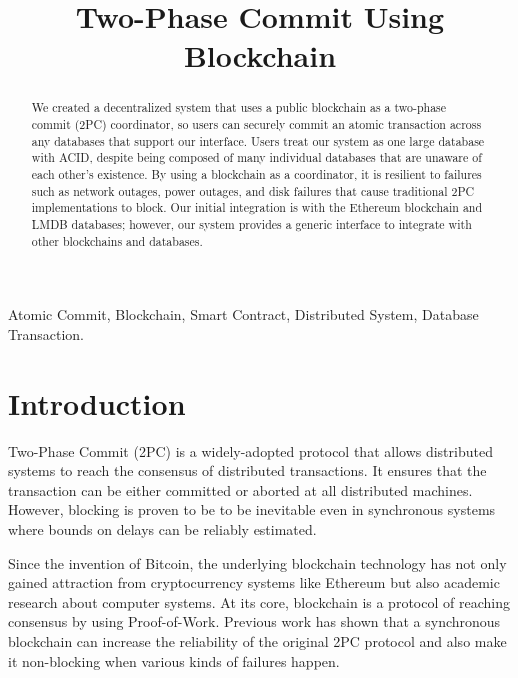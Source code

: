\documentclass[11pt,conference]{IEEEtran}
\begin{document}
\title{Two-Phase Commit Using Blockchain}

\author{
  \and
  \and
}

\maketitle

\begin{abstract}
  We created a decentralized system that uses a public blockchain as a two-phase commit (2PC) coordinator, so users can securely commit an atomic transaction across any databases that support our interface. Users treat our system as one large database with ACID, despite being composed of many individual databases that are unaware of each other’s existence. By using a blockchain as a coordinator, it is resilient to failures such as network outages, power outages, and disk failures that cause traditional 2PC implementations to block. Our initial integration is with the Ethereum blockchain and LMDB databases; however, our system provides a generic interface to integrate with other blockchains and databases.
\end{abstract}

\begin{IEEEkeywords}
  Atomic Commit, Blockchain, Smart Contract, Distributed System, Database Transaction.
\end{IEEEkeywords}

\section{Introduction}
Two-Phase Commit (2PC) is a widely-adopted protocol that allows distributed systems to reach the consensus of distributed transactions. It ensures that the transaction can be either committed or aborted at all distributed machines. However, blocking is proven \cite{skeen1981nonblocking} to be to be inevitable even in synchronous systems where bounds on delays can be reliably estimated. 

Since the invention of Bitcoin, the underlying blockchain technology has not only gained attraction from  cryptocurrency systems like Ethereum \cite{wood2014ethereum} but also academic research about computer systems. At its core, blockchain  is a protocol of reaching consensus by using Proof-of-Work. Previous work \cite{ezhilchelvan2020non} has shown that a synchronous blockchain can increase the reliability of the original 2PC protocol and also make it non-blocking when various kinds of failures happen.
\end{document}

